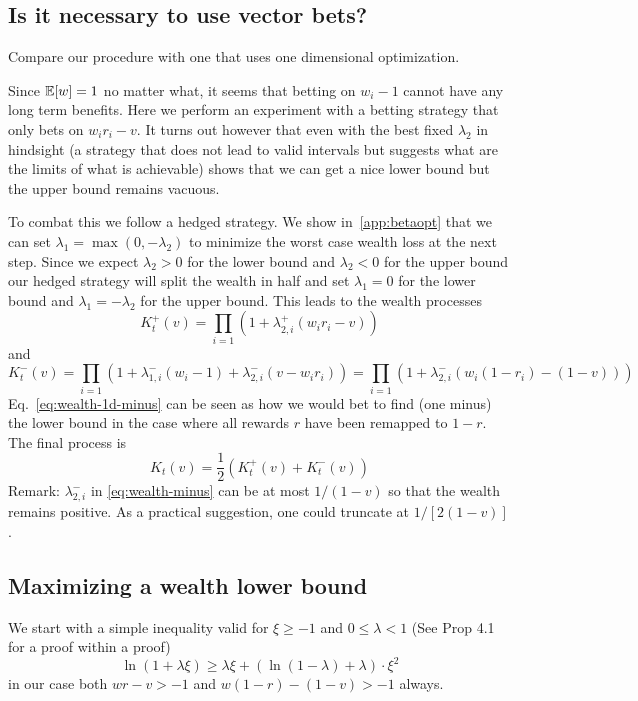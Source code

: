 \subsection{Is it necessary to use vector bets?}
Compare our procedure with one that uses one dimensional optimization.

Since $\mathbb{E}[w]=1$ no matter what, it seems that betting  on $w_i-1$ 
cannot have any long term benefits. Here we perform an experiment with a 
betting strategy that only bets on $w_i r_i -v$. It turns out however that
even with the best fixed $\lambda_2$ in hindsight (a strategy that does not lead 
to valid intervals but suggests what are the limits of what is achievable) 
shows that we can get a nice lower bound but the upper bound remains vacuous. 

To combat this we follow a hedged strategy. 
We show 
in~\ref{app:betaopt} that we can set $\lambda_1=\max(0,-\lambda_2)$ to minimize the worst case wealth loss at the next step.
Since we expect $\lambda_2>0$ for the lower bound and $\lambda_2<0$ 
for the upper bound our hedged strategy will 
split the wealth in 
half and set $\lambda_1=0$ for the lower bound and $\lambda_1=-\lambda_2$ 
for the upper bound. This leads to the wealth processes
\[
K_t^{+}(v)=\prod_{i=1} (1+\lambda_{2,i}^{+} (w_i r_i -v))
\]
and
\begin{equation}\label{eq:wealth-1d-minus}
K_t^{-}(v)=\prod_{i=1} (1+\lambda_{1,i}^{-}(w_i-1)+\lambda_{2,i}^{-} (v-w_i r_i))
=\prod_{i=1} (1+\lambda_{2,i}^{-} (w_i (1-r_i)-(1-v)))
\end{equation}
Eq.~\eqref{eq:wealth-1d-minus} 
can be seen as how we would bet to find (one minus) the 
lower bound in the case where all rewards $r$ have been remapped 
to $1-r$. The final process is 
\[
K_t(v)=\frac{1}{2}(K_t^{+}(v)+K_t^{-}(v))
\]
Remark: $\lambda_{2,i}^{-}$ in \eqref{eq:wealth-minus} can be at most $1/(1-v)$ so that the wealth remains positive. As a practical suggestion, one could truncate at $1/[2(1-v)]$.

\subsection{Maximizing a wealth lower bound}

We start with a simple inequality valid for $\xi\geq-1$ and 
$0\leq \lambda < 1$ (See \cite{fan2015exponential} Prop 4.1 for a proof within a proof)
\begin{equation}
\ln(1+\lambda \xi) \geq \lambda \xi+\left(\ln\left(1-\lambda\right)+\lambda\right)\cdot \xi^{2}
\label{eq:fanbound}
\end{equation}
in our case both $wr-v>-1$ and $w(1-r)-(1-v)>-1$ always.

